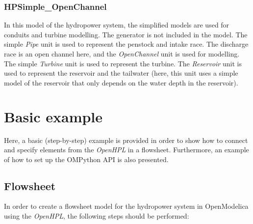 \documentclass[%
]{USN-PhD}
\begin{document}
\subsection{HPSimple\_OpenChannel}

In this model of the hydropower system, the simplified models are used for conduits and turbine modelling. The generator is not included in the model. The simple \emph{Pipe} unit is used to represent the penstock and intake race. The discharge race is an open channel here, and the \emph{OpenChannel} unit is used for modelling. The simple \emph{Turbine} unit is used to represent the turbine. The \emph{Reservoir} unit is used to represent the reservoir and the tailwater  (here, this unit uses a simple model of the reservoir that only depends on the water depth in the reservoir).

\chapter{Basic example}

Here, a basic (step-by-step) example is provided in order to show how to connect and specify elements from the \emph{OpenHPL} in a flowsheet. Furthermore, an example of how to set up the OMPython API is also presented.

\section{Flowsheet}

In order to create a flowsheet model for the hydropower system in OpenModelica using the \emph{OpenHPL}, the following steps should be performed:
\end{document}
